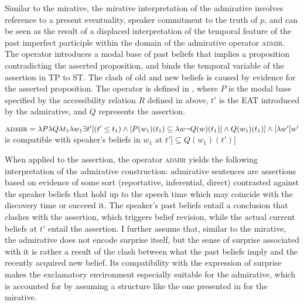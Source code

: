 \documentclass[output=paper,
colorlinks,
citecolor=brown,
newtxmath
]{langscibook}
\begin{document}
Similar to the  mirative, the mirative interpretation of the  admirative involves reference to a present eventuality, speaker commitment to the truth of $p$, and can be seen as the result of a displaced interpretation of the temporal feature of the past imperfect participle within the domain of the admirative operator \textsc{admir}. The operator introduces a modal base of past beliefs that implies a proposition contradicting the asserted proposition, and binds the temporal variable of the assertion in TP to ST.
The clash of old and new beliefs is caused by evidence for the asserted proposition.
The operator is defined in , where $P$ is the modal base specified by the accessibility relation $R$ defined in  above,
$t'$ is the EAT introduced by the admirative, and $Q$ represents the assertion.

\ea\label{def:admir}
$\textsc{admir} = \lambda P \lambda Q \lambda t_1 \lambda w_1 \exists t' [ (t' \leq t_1 ) \wedge [ P(w_1)(t_1) \subseteq \lambda w \neg Q(w)(t_1)] \wedge Q(w_1)(t_1)] \newline \wedge [\lambda w'[ w'$ is compatible with speaker's beliefs in $w_1$ at $t'] \subseteq Q(w_1)(t')]$
\z

\noindent When applied to the assertion, the operator \textsc{admir} yields the following interpretation of the admirative construction: admirative sentences are assertions based on evidence of some sort (reportative, inferential, direct) contrasted against the speaker beliefs that hold up to the speech time which may coincide with the discovery time or succeed it.
The speaker's past beliefs entail a conclusion that clashes with the assertion, which triggers belief revision, while the actual current beliefs at $t'$ entail the assertion.
I further assume that, similar to the  mirative, the  admirative does not encode surprise itself, but the sense of surprise associated with it is rather a result of the clash between what the past beliefs imply and the recently acquired new belief. Its compatibility with the expression of surprise makes the exclamatory environment especially suitable for the admirative, which is accounted for by assuming a structure like the one presented in  for the  mirative.
\end{document}
